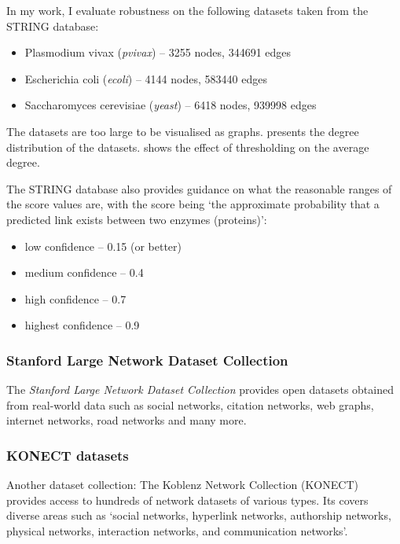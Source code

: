 In my work, I evaluate robustness on the following datasets taken from the STRING database:
\begin{itemize}
    \item Plasmodium vivax (\textsl{pvivax}) -- 3255 nodes, 344691 edges
    \item Escherichia coli (\textsl{ecoli}) -- 4144 nodes, 583440 edges
    \item Saccharomyces cerevisiae (\textsl{yeast}) -- 6418 nodes, 939998 edges
\end{itemize}

The datasets are too large to be visualised as graphs.
 presents the degree distribution of the datasets.
 shows the effect of thresholding on the average degree.

The STRING database also provides guidance on what the reasonable ranges of the score values are, with the score being `the approximate probability that a predicted link exists between two enzymes (proteins)':
\begin{itemize}
    \item low confidence -- 0.15 (or better)
    \item medium confidence -- 0.4
    \item high confidence -- 0.7
    \item highest confidence -- 0.9
\end{itemize}

\subsubsection{Stanford Large Network Dataset Collection}

The \textit{Stanford Large Network Dataset Collection}\cite{Large2016} provides open datasets obtained from real-world data such as social networks, citation networks, web graphs, internet networks, road networks and many more.


\subsubsection{KONECT datasets}

Another dataset collection: The Koblenz Network Collection (KONECT)~\cite{Kunegis2013} provides access to hundreds of network datasets of various types.
Its covers diverse areas such as `social networks, hyperlink networks, authorship networks, physical networks, interaction networks, and communication networks'.

